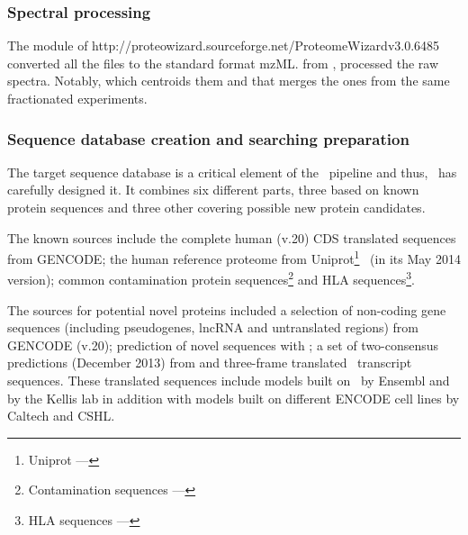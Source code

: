 \subsubsection{Spectral processing}\label{subsub:spectralProcessing}

The  module of %
{http://proteowizard.sourceforge.net/}{ProteomeWizard}{v3.0.6485}
converted all the files to the standard format mzML.\@
{} from
,
processed the raw spectra. Notably,  which centroids them
and  that merges the ones from the same fractionated experiments.

\subsubsection{Sequence database creation and searching preparation}%
\label{subsub:seqDBseeking}

The target sequence database is a critical element of the \ms\ pipeline and thus,
\james\ has carefully designed it.
It combines six different parts, three based on
known protein sequences and three other covering possible new protein candidates.

The known sources include the complete human  (v.20) \gls{CDS} translated
sequences from \gls{GENCODE}; the human reference proteome from
\gls{Uniprot}\footnote{%
\gls{Uniprot} --- }~
(in its May 2014 version); common contamination protein
sequences\footnote{Contamination sequences ---
}
and \gls{HLA} sequences\footnote{\gls{HLA} sequences ---
}.

The sources for potential
novel proteins included a selection of non-coding gene sequences (including
pseudogenes, \gls{lncRNA} and untranslated regions) from \gls{GENCODE}
 (v.20); prediction of novel sequences with
;
a set of two-consensus predictions (December 2013)
from 
and three-frame translated \Rnaseq\ transcript sequences.
These translated sequences include models
built on \ibm\ by \gls{Ensembl} and by the Kellis lab in addition with
models built on different \gls{ENCODE} cell lines by Caltech and CSHL\@.

